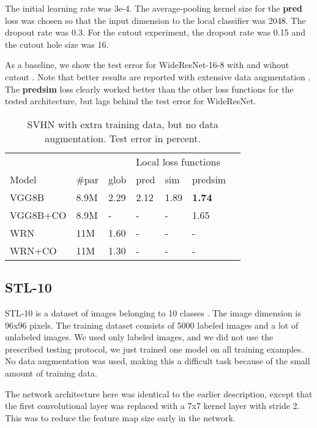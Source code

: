 \documentclass{article}
\begin{document}
The initial learning rate was 3e-4. The average-pooling kernel size for the \textbf{pred} loss was chosen so that the input dimension to the local classifier was 2048. The dropout rate was 0.3. For the cutout experiment, the dropout rate was 0.15 and the cutout hole size was 16.

As a baseline, we show the test error for WideResNet-16-8 with and wihout cutout \cite{DevriesT17}. Note that better results are reported with extensive data augmentation \cite{CubukZMVL18}. The \textbf{predsim} loss clearly worked better than the other loss functions for the tested architecture, but lags behind the test error for WideResNet. 

\begin{table}[h]
  \caption{SVHN with extra training data, but no data augmentation. Test error in percent.}
  \label{table:svhn}
  \centering
  \begin{tabular}{lllllll}
    \toprule
    &&& \multicolumn{3}{|l}{Local loss functions} \\
    Model   & \#par & glob & \multicolumn{1}{|l}{pred} & sim & \multicolumn{1}{l}{predsim}  \\
    \midrule
    VGG8B & 8.9M &  2.29 & \multicolumn{1}{|l}{2.12} & 1.89  & \textbf{1.74} \\
    VGG8B+CO & 8.9M &  - & \multicolumn{1}{|l}{-} & -  & 1.65 \\
    \midrule
    WRN & 11M & 1.60  & \multicolumn{1}{|l}{-} & - & - \\
    WRN+CO & 11M & 1.30  & \multicolumn{1}{|l}{-} & - & - \\
    \bottomrule
  \end{tabular}
\end{table}

\subsection{STL-10}

STL-10 is a dataset of images belonging to 10 classes \cite{CoatesNL11}. The image dimension is 96x96 pixels. The training dataset consists of 5000 labeled images and a lot of unlabeled images. We used only labeled images, and we did not use the prescribed testing protocol, we just trained one model on all training examples. No data augmentation was used, making this a difficult task because of the small amount of training data. 

The network architecture here was identical to the earlier description, except that the first convolutional layer was replaced with a 7x7 kernel layer with stride 2. This was to reduce the feature map size early in the network. 
\end{document}
